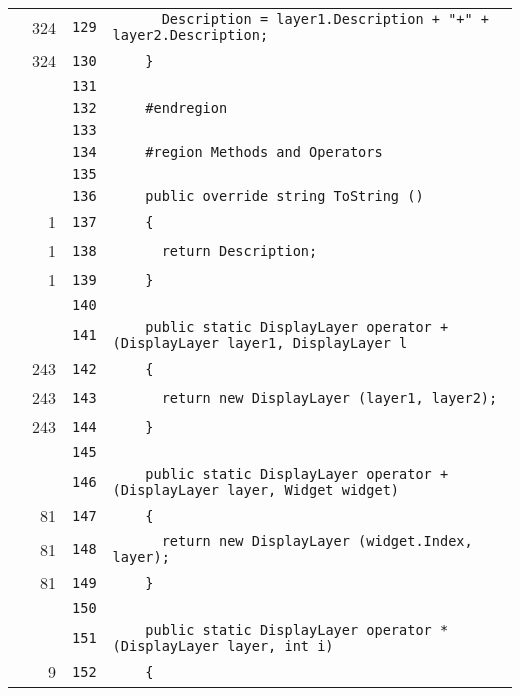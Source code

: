 \documentclass[a4paper,10pt]{article}
\begin{document}
\begin{longtable}[l]{lrrl}
\cellcolor{green} & 324 & \verb~129~ & \verb~      Description = layer1.Description + "+" + layer2.Description;~\\
\cellcolor{green} & 324 & \verb~130~ & \verb~    }~\\
\cellcolor{gray} &  & \verb~131~ & \verb~~\\
\cellcolor{gray} &  & \verb~132~ & \verb~    #endregion~\\
\cellcolor{gray} &  & \verb~133~ & \verb~~\\
\cellcolor{gray} &  & \verb~134~ & \verb~    #region Methods and Operators~\\
\cellcolor{gray} &  & \verb~135~ & \verb~~\\
\cellcolor{gray} &  & \verb~136~ & \verb~    public override string ToString ()~\\
\cellcolor{green} & 1 & \verb~137~ & \verb~    {~\\
\cellcolor{green} & 1 & \verb~138~ & \verb~      return Description;~\\
\cellcolor{green} & 1 & \verb~139~ & \verb~    }~\\
\cellcolor{gray} &  & \verb~140~ & \verb~~\\
\cellcolor{gray} &  & \verb~141~ & \verb~    public static DisplayLayer operator + (DisplayLayer layer1, DisplayLayer l~\\
\cellcolor{green} & 243 & \verb~142~ & \verb~    {~\\
\cellcolor{green} & 243 & \verb~143~ & \verb~      return new DisplayLayer (layer1, layer2);~\\
\cellcolor{green} & 243 & \verb~144~ & \verb~    }~\\
\cellcolor{gray} &  & \verb~145~ & \verb~~\\
\cellcolor{gray} &  & \verb~146~ & \verb~    public static DisplayLayer operator + (DisplayLayer layer, Widget widget)~\\
\cellcolor{green} & 81 & \verb~147~ & \verb~    {~\\
\cellcolor{green} & 81 & \verb~148~ & \verb~      return new DisplayLayer (widget.Index, layer);~\\
\cellcolor{green} & 81 & \verb~149~ & \verb~    }~\\
\cellcolor{gray} &  & \verb~150~ & \verb~~\\
\cellcolor{gray} &  & \verb~151~ & \verb~    public static DisplayLayer operator * (DisplayLayer layer, int i)~\\
\cellcolor{green} & 9 & \verb~152~ & \verb~    {~\\

\end{longtable}
\end{document}

